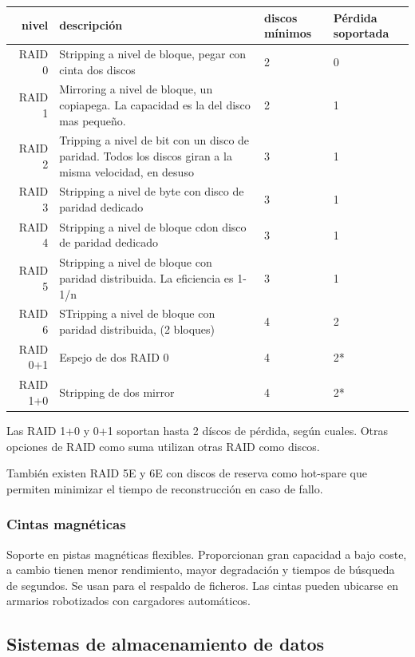         \begin{table}[H]
        \begin{tabular}{rlll}
            nivel & descripción & discos mínimos & Pérdida soportada\\
            \midrule
            RAID 0 & Stripping a nivel de bloque, pegar con cinta dos discos & 2 & 0 \\
            RAID 1 & Mirroring a nivel de bloque, un copiapega. La capacidad es la del disco mas pequeño.  & 2 & 1 \\
            RAID 2 & Tripping a nivel de bit con un disco de paridad. Todos los discos giran a la misma velocidad, en desuso & 3 & 1 \\
            RAID 3 & Stripping a nivel de byte con disco de paridad dedicado & 3 & 1 \\
            RAID 4 & Stripping a nivel de bloque cdon disco de paridad dedicado & 3 & 1\\
            RAID 5 & Stripping a nivel de bloque con paridad distribuida. La eficiencia es 1-1/n & 3 & 1 \\
            RAID 6 & STripping a nivel de bloque con paridad distribuida, (2 bloques) & 4 & 2\\
            RAID 0+1 & Espejo de dos RAID 0 & 4 & 2* \\
            RAID 1+0 & Stripping de dos mirror & 4 & 2*\\
        \end{tabular}
        \end{table}
        Las RAID 1+0 y 0+1 soportan hasta 2 díscos de pérdida, según cuales. Otras opciones de RAID como suma utilizan otras RAID como discos.

        También existen RAID 5E y 6E con discos de reserva como hot-spare que permiten minimizar el tiempo de reconstrucción en caso de fallo.
    \subsubsection{Cintas magnéticas}
        Soporte en pistas magnéticas flexibles. Proporcionan gran capacidad a bajo coste, a cambio tienen menor rendimiento, mayor degradación y tiempos de búsqueda de segundos. Se usan para el respaldo de ficheros. Las cintas pueden ubicarse en armarios robotizados con cargadores automáticos.

\subsection{Sistemas de almacenamiento de datos}


